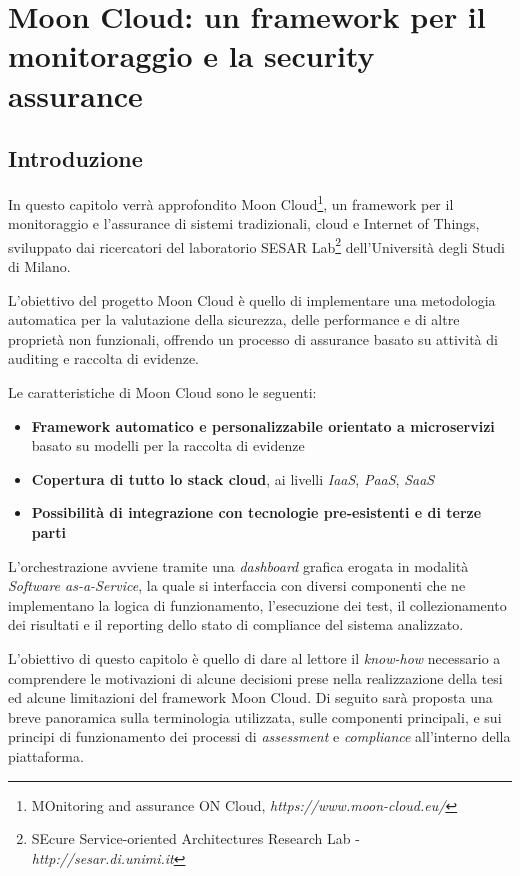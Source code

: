 \documentclass[../main.tex]{subfiles}
\begin{document}
\chapter{Moon Cloud: un framework per il monitoraggio e la security assurance}
\section{Introduzione}
In questo capitolo verrà approfondito Moon Cloud\footnote{MOnitoring and assurance ON Cloud, \textit{https://www.moon-cloud.eu/}}, un framework per il monitoraggio e l'assurance di sistemi tradizionali, cloud e Internet of Things, sviluppato dai ricercatori del laboratorio SESAR Lab\footnote{SEcure Service-oriented Architectures Research Lab - \textit{http://sesar.di.unimi.it}} dell'Università degli Studi di Milano.

L'obiettivo del progetto Moon Cloud è quello di implementare una metodologia automatica per la valutazione della sicurezza, delle performance e di altre proprietà non funzionali, offrendo un processo di assurance basato su attività di auditing e raccolta di evidenze.

Le caratteristiche di Moon Cloud sono le seguenti\cite{MoonCloudWebsite}:
\begin{itemize}
    \item \textbf{Framework automatico e personalizzabile orientato a microservizi} basato su modelli per la raccolta di evidenze
    \item \textbf{Copertura di tutto lo stack cloud}, ai livelli \textit{IaaS}, \textit{PaaS}, \textit{SaaS}
    \item \textbf{Possibilità di integrazione con tecnologie pre-esistenti e di terze parti}
\end{itemize}

L'orchestrazione avviene tramite una  \textit{dashboard} grafica erogata in modalità \textit{Software as-a-Service}, la quale si interfaccia con diversi componenti che ne implementano la logica di funzionamento, l'esecuzione dei test, il collezionamento dei risultati e il reporting dello stato di compliance del sistema analizzato.

L'obiettivo di questo capitolo è quello di dare al lettore il \textit{know-how} necessario a comprendere le motivazioni di alcune decisioni prese nella realizzazione della tesi ed alcune limitazioni del framework Moon Cloud. 
Di seguito sarà proposta una breve panoramica sulla terminologia utilizzata, sulle componenti principali,  e sui principi di funzionamento dei processi di \textit{assessment} e \textit{compliance} all'interno della piattaforma.
\end{document}

